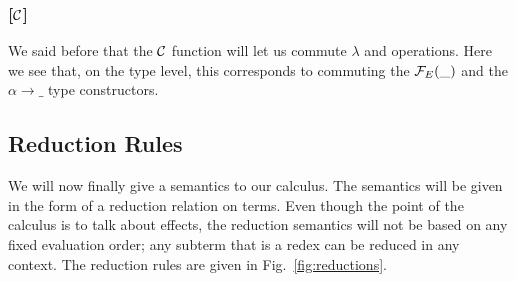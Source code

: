 \documentclass{llncs}
\begin{document}
\subsubsection*{[$\mathcal{C}$]}

We said before that the $\mathcal{C}$ function will let us commute $\lambda$ and
operations. Here we see that, on the type level, this corresponds to
commuting the $\mathcal{F}_E(\_)$ and the $\alpha \to \_$ type constructors.

\subsection{Reduction Rules}
\label{ssec:reductions}

We will now finally give a semantics to our calculus. The semantics will be
given in the form of a reduction relation on terms. Even though the point
of the calculus is to talk about effects, the reduction semantics will not
be based on any fixed evaluation order; any subterm that is a redex can be
reduced in any context. The reduction rules are given in
Fig.~\ref{fig:reductions}.
\end{document}
